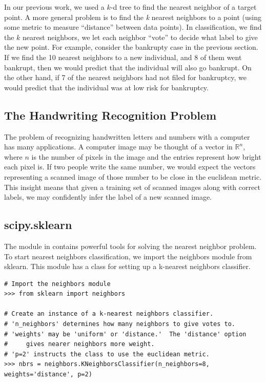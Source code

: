 In our previous work, we used a $k$-d tree to find the nearest neighbor of a target point.
A more general problem is to find the \emph{k} nearest neighbors to a point (using some metric to measure ``distance'' between data points).
In classification, we find the $k$ nearest neighbors, we let each neighbor ``vote'' to decide what label to give the new point.
For example, consider the bankrupty case in the previous section.
If we find the 10 nearest neighbors to a new individual, and 8 of them went bankrupt, then we would predict that the individual will also go bankrupt.
On the other hand, if 7 of the nearest neighbors had not filed for bankruptcy, we would predict that the individual was at low risk for bankruptcy.

\subsection*{The Handwriting Recognition Problem}

The problem of recognizing handwritten letters and numbers with a computer has many applications.
A computer image may be thought of a vector in $\mathbb{R}^n$, where $n$ is the number of pixels in the image and the entries represent how bright each pixel is.
If two people write the same number, we would expect the vectors representing a scanned image of those number to be close in the euclidean metric.
This insight means that given a training set of scanned images along with correct labels, we may confidently infer the label of a new scanned image.

\subsection*{scipy.sklearn}

The  module in  contains powerful tools for solving the nearest neighbor problem.
To start nearest neighbors classification, we import the neighbors module from sklearn.
This module has a class for setting up a k-nearest neighbors classifier.
\begin{lstlisting}
# Import the neighbors module
>>> from sklearn import neighbors

# Create an instance of a k-nearest neighbors classifier.
# 'n_neighbors' determines how many neighbors to give votes to.
# 'weights' may be 'uniform' or 'distance.'  The 'distance' option
#     gives nearer neighbors more weight.
# 'p=2' instructs the class to use the euclidean metric.
>>> nbrs = neighbors.KNeighborsClassifier(n_neighbors=8, weights='distance', p=2)
\end{lstlisting}

